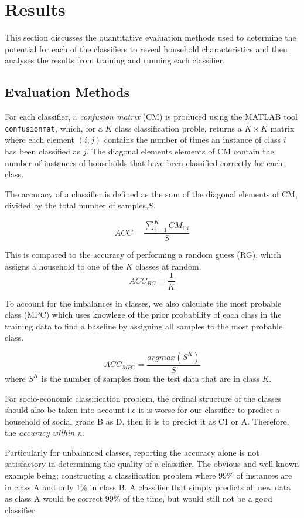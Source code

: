 \chapter{Results}

This section discusses the quantitative evaluation methods used to determine the potential for each of the classifiers to reveal household characteristics and then analyses the results from training and running each classifier.

\section{Evaluation Methods}

For each classifier, a \textit{confusion matrix} (CM) is produced using the MATLAB tool \texttt{confusionmat}, which, for a $K$ class classification proble, returns a $K\times K$ matrix where each element $(i,j)$ contains the number of times an instance of class $i$ has been classified as $j$. The diagonal elements elements of CM contain the number of instances of households that have been classified correctly for each class. \cite{Stefanowski}


The accuracy of a classifier is defined as the sum of the diagonal elements of CM, divided by the total number of samples,$S$.

\[ACC=\frac{\sum_{i=1}^KCM_{i,i}}{S}\]

This is compared to the accuracy of performing a random guess (RG), which assigns a household to one of the $K$ classes at random.
\[ACC_{RG}=\frac{1}{K}\]

To account for the imbalances in classes, we also calculate the most probable class (MPC) which uses knowlege of the prior probability of each class in the training data to find a baseline by assigning all samples to the most probable class. 

\[ACC_{MPC}=\frac{argmax(S^K)}{S}\]
where $S^K$ is the number of samples from the test data that are in class $K$.

\bigskip

For socio-economic classification problem, the ordinal structure of the classes should also be taken into account i.e it is worse for our classifier to predict a household of social grade B as D, then it is to predict it as C1 or A. Therefore, the \textit{accuracy within n}\cite{Gaudette}. 


Particularly for unbalanced classes, reporting the accuracy alone is not satisfactory in determining the quality of a classifier. The obvious and well known example being; constructing a classification problem where 99\% of instances are in class A and only 1\% in class B. A classifier that simply predicts all new data as class A would be correct 99\% of the time, but would still not be a good classifier. 

